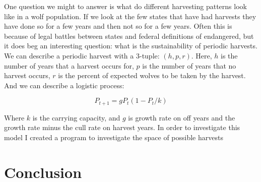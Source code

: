 \documentclass[12pt]{article}
\begin{document}
One question we might to answer is what do different harvesting patterns look like in a wolf population.
If we look at the few states that have had harvests they have done so for a few years and then not so for a few years.
Often this is because of legal battles between states and federal definitions of endangered,
but it does beg an interesting question:
what is the sustainability of periodic harvests.
We can describe a periodic harvest with a 3-tuple: $(h, p, r)$.
Here, 
$h$ is the number of years that a harvest occurs for, 
$p$ is the number of years that no harvest occurs, 
$r$ is the percent of expected wolves to be taken by the harvest.
And we can describe a logistic process:

$$ P_{t+1} = gP_t (1 - P_t/k)$$

Where $k$ is the carrying capacity, and $g$ is growth rate on off years
and the growth rate minus the cull rate on harvest years.
In order to investigate this model I created a program to investigate the space of possible harvests

\section{Conclusion}

{}

\end{document}
